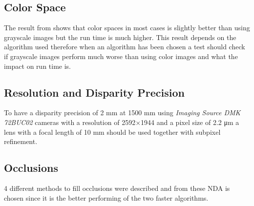 \subsection*{Color Space}
The result from \cite{chambon2005colour} shows that color spaces in most cases is slightly better than using grayscale images but the run time is much higher. This result depends on the algorithm used therefore when an algorithm has been chosen a test should check if grayscale images perform much worse than using color images and what the impact on run time is.

\subsection*{Resolution and Disparity Precision}
To have a disparity precision of 2 mm at 1500 mm using \textit{Imaging Source DMK 72BUC02} cameras with a resolution of 2592$\times$1944 and a pixel size of 2.2 \si{\micro\meter} a lens with a focal length of 10 mm should be used together with subpixel refinement.

\subsection*{Occlusions}
4 different methods to fill occlusions were described and from these NDA is chosen since it is the better performing of the two faster algorithms.